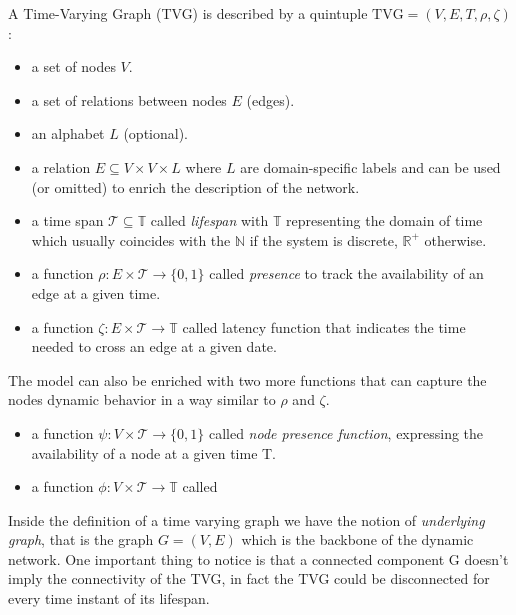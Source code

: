 	A Time-Varying Graph (TVG) is described by a quintuple \(\text{TVG} = (V, E, T, \rho, \zeta) \):
	\begin{itemize}
		\item a set of nodes \(V\).
		
		\item a set of relations between nodes \(E\) (edges).	
		
		\item an alphabet \(L\) (optional).
		
		\item a relation \(E \subseteq V \times V \times L\) where \(L\) are domain-specific labels and can be used (or omitted) to enrich the description of the network.
		
		\item a time span \( \mathcal{T} \subseteq \mathbb{T}\) called \textit{lifespan} with \(\mathbb{T}\) representing the domain of time which usually coincides with the \(\mathbb{N}\) if the system is discrete, \(\mathbb{R}^+\) otherwise.
		
		\item a function \(\rho : E \times \mathcal{T} \to \{0, 1\} \) called \textit{presence} to track the availability of an edge at a given time.
		
		\item a function \(\zeta : E \times \mathcal{T} \to \mathbb{T}\) called latency function that indicates the time needed to cross an edge at a given date.
	\end{itemize}

	The model can also be enriched with two more functions that can capture the nodes dynamic behavior in a way similar to \(\rho\) and \(\zeta\).
	\begin{itemize}
		\item a function \(\psi : V \times \mathcal{T} \to \{0, 1\}\) called \textit{node presence function}, expressing the availability of a node at a given time T.
		
		\item a function \(\phi : V \times \mathcal{T} \to \mathbb{T}\) called 
	\end{itemize}
	
	Inside the definition of a time varying graph we have the notion of \textit{underlying graph}, that is the graph \(G = (V, E)\) which is the backbone of the dynamic network. One important thing to notice is that a connected component G doesn't imply the connectivity of the TVG, in fact the TVG could be disconnected for every time instant of its lifespan.
	
